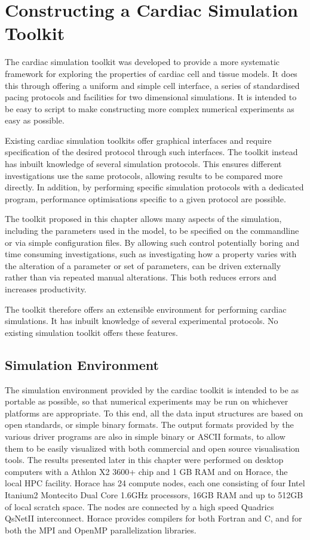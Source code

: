 \chapter{Constructing a Cardiac Simulation Toolkit}
\label{chapter:toolkit}

The cardiac simulation toolkit was developed to provide a more systematic
framework for exploring the properties of cardiac cell and tissue models.
It does this through offering a uniform and simple cell interface, a series of
standardised pacing protocols and facilities for two dimensional simulations.
It is intended to be easy to script to make constructing more complex numerical
experiments as easy as possible.

Existing cardiac simulation toolkits offer graphical interfaces and require
specification of the desired protocol through such interfaces.
The toolkit instead has inbuilt knowledge of several simulation protocols.
This ensures different investigations use the same protocols, allowing results
to be compared more directly.
In addition, by performing specific simulation protocols with a dedicated
program, performance optimisations specific to a given protocol are possible.

The toolkit proposed in this chapter allows many aspects of the simulation,
including the parameters used in the model, to be specified on the commandline
or via simple configuration files.
By allowing such control potentially boring and time consuming investigations,
such as investigating how a property varies with the alteration of a parameter
or set of parameters, can be driven externally rather than via repeated manual
alterations.
This both reduces errors and increases productivity.

The toolkit therefore offers an extensible environment for performing cardiac
simulations.
It has inbuilt knowledge of several experimental protocols.
No existing simulation toolkit offers these features.


\section{Simulation Environment}

The simulation environment provided by the cardiac toolkit is intended to be as
portable as possible, so that numerical experiments may be run on whichever
platforms are appropriate.  To this end, all the data input structures are based
on open standards, or simple binary formats.  The output formats provided by the
various driver programs are also in simple binary or ASCII formats, to allow
them to be easily visualized with both commercial and open source visualisation
tools.  The results presented later in this chapter were performed on desktop
computers with a Athlon X2 3600+ chip and 1 GB RAM and on Horace, the local HPC
facility.  Horace has 24 compute nodes, each one consisting of four Intel Itanium2
Montecito Dual Core 1.6GHz processors, 16GB RAM and up to 512GB of local scratch
space.  The nodes are connected by a high speed Quadrics QsNetII
interconnect.  Horace provides compilers for both Fortran and C,
and for both the MPI and OpenMP parallelization libraries.

